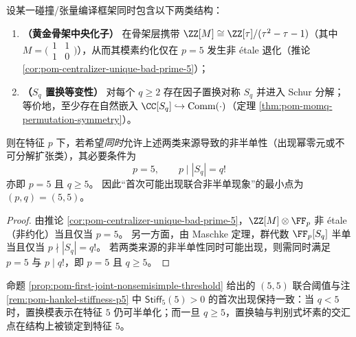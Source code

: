 \begin{proposition}[判别式坏素与置换模表示阈值的首次联合点：\texorpdfstring{$(p,q)=(5,5)$}{(p,q)=(5,5)}]\label{prop:pom-first-joint-nonsemisimple-threshold}
设某一碰撞/张量编译框架同时包含以下两类结构：
\begin{enumerate}
  \item \textbf{（黄金骨架中央化子）} 在骨架层携带 \(\ZZ[M]\cong \ZZ[\tau]/(\tau^2-\tau-1)\)（其中 \(M=\bigl(\begin{smallmatrix}1&1\\[2pt]1&0\end{smallmatrix}\bigr)\)），从而其模素约化仅在 \(p=5\) 发生非 \'{e}tale 退化（推论 \ref{cor:pom-centralizer-unique-bad-prime-5}）；
  \item \textbf{（\texorpdfstring{$S_q$}{Sq} 置换等变性）} 对每个 \(q\ge 2\) 存在因子置换对称 \(S_q\) 并进入 Schur 分解；等价地，至少存在自然嵌入 \(\CC[S_q]\hookrightarrow \mathrm{Comm}(\cdot)\)（定理 \ref{thm:pom-momq-permutation-symmetry}）。
\end{enumerate}
则在特征 \(p\) 下，若希望\emph{同时}允许上述两类来源导致的非半单性（出现幂零元或不可分解扩张类），其必要条件为
\[
\boxed{\;p=5,\qquad p\mid |S_q|=q!\;}
\]
亦即 \(p=5\) 且 \(q\ge 5\)。
因此“首次可能出现联合非半单现象”的最小点为 \(\boxed{(p,q)=(5,5)}\)。
\end{proposition}
\begin{proof}
由推论 \ref{cor:pom-centralizer-unique-bad-prime-5}，\(\ZZ[M]\otimes\FF_p\) 非 \'{e}tale（非约化）当且仅当 \(p=5\)。
另一方面，由 Maschke 定理，群代数 \(\FF_p[S_q]\) 半单当且仅当 \(p\nmid |S_q|=q!\)。
若两类来源的非半单性同时可能出现，则需同时满足 \(p=5\) 与 \(p\mid q!\)，即 \(p=5\) 且 \(q\ge 5\)。
\end{proof}

\begin{remark}\label{rem:pom-first-joint-nonsemisimple-threshold-hankel}
命题 \ref{prop:pom-first-joint-nonsemisimple-threshold} 给出的 \((5,5)\) 联合阈值与注 \ref{rem:pom-hankel-stiffness-p5} 中
\(\mathsf{Stiff}_5(5)>0\) 的首次出现保持一致：当 \(q<5\) 时，置换模表示在特征 \(5\) 仍可半单化；而一旦 \(q\ge 5\)，置换轴与判别式坏素的交汇点在结构上被锁定到特征 \(5\)。
\end{remark}

